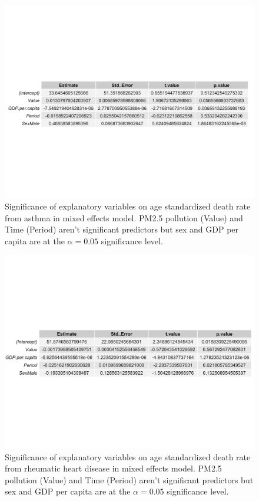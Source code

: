 \documentclass[12pt, letterpaper, twoside]{article}\usepackage[]{graphicx}\usepackage[]{xcolor}
\begin{document}
\begin{figure}[t]
\includegraphics[scale=0.5]{asthma.chart.pdf}
  \centering
  \caption{Significance of explanatory variables on age standardized death rate
  from asthma in mixed effects model. PM2.5 pollution (Value) and Time (Period)
  aren't significant predictors but sex and GDP per capita are at the
  \begin{math}\alpha = 0.05\end{math} significance level.}
\end{figure}

\begin{figure}[t]
\includegraphics[scale=0.5]{rheum.chart.pdf}
  \centering
  \caption{Significance of explanatory variables on age standardized death rate
  from rheumatic heart disease in mixed effects model. PM2.5 pollution (Value)
  and Time (Period) aren't significant predictors but sex and GDP per capita are
  at the \begin{math}\alpha = 0.05\end{math} significance level.}
\end{figure}
\end{document}
